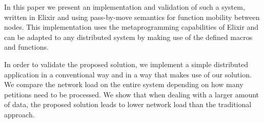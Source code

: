 In this paper we present an implementation and validation of such a system, written in Elixir and using pass-by-move semantics for function mobility between nodes. This implementation uses the metaprogramming capabilities of Elixir and can be adapted to any distributed system by making use of the defined macros and functions.

In order to validate the proposed solution, we implement a simple distributed application in a conventional way and in a way that makes use of our solution. We compare the network load on the entire system depending on how many petitions need to be processed. We show that when dealing with a larger amount of data, the proposed solution leads to lower network load than the traditional approach.


\endinput

